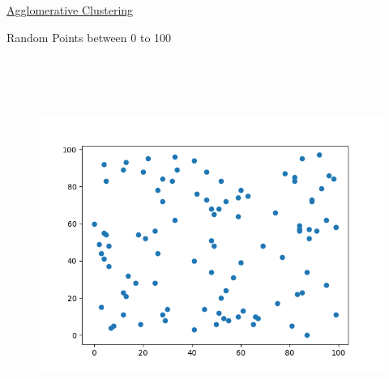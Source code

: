 \documentclass[12pt]{article}
\renewcommand{\_}{\kern-1.5pt\textunderscore\kern-1.5pt}
\begin{document}

\par


\vspace{\baselineskip}

\vspace{\baselineskip}

\vspace{\baselineskip}

\vspace{\baselineskip}

\vspace{\baselineskip}

\vspace{\baselineskip}

\vspace{\baselineskip}

\vspace{\baselineskip}

\vspace{\baselineskip}

\vspace{\baselineskip}

\vspace{\baselineskip}
{\fontsize{14pt}{16.8pt}\selectfont \uline{Agglomerative Clustering}\par}\par

{\fontsize{14pt}{16.8pt} Random Points between 0 to 100\par}\par




\begin{figure}[H]
	\begin{Center}
		\includegraphics[width=6.4in,height=4.8in]{./media/image17.png}
	\end{Center}
\end{figure}
\end{document}
